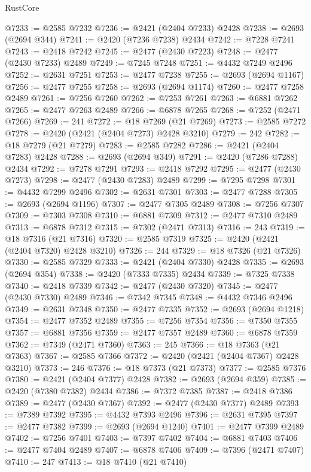 \begin{lexlean}{RustCore}
\begin{coremodule}
@7233 := @2585 @7232
@7236 := @2421 (@2404 @7233) @2428
@7238 := @2693 (@2694 @344)
@7241 := @2420 (@7236 @7238) @2434
@7242 := @7228 @7241
@7243 := @2418 @7242
@7245 := @2477 (@2430 @7223)
@7248 := @2477 (@2430 @7233) @2489
@7249 := @7245 @7248
@7251 := @4432 @7249 @2496
@7252 := @2631 @7251
@7253 := @2477 @7238
@7255 := @2693 (@2694 @1167)
@7256 := @2477 @7255
@7258 := @2693 (@2694 @1174)
@7260 := @2477 @7258 @2489
@7261 := @7256 @7260
@7262 := @7253 @7261
@7263 := @6881 @7262
@7265 := @2477 @7263 @2489
@7266 := @6878 @7265
@7268 := @7252 (@2471 @7266)
@7269 := 241
@7272 := @18 @7269 (@21 @7269)
@7273 := @2585 @7272
@7278 := @2420 (@2421 (@2404 @7273) @2428 @3210)
@7279 := 242
@7282 := @18 @7279 (@21 @7279)
@7283 := @2585 @7282
@7286 := @2421 (@2404 @7283) @2428
@7288 := @2693 (@2694 @349)
@7291 := @2420 (@7286 @7288) @2434
@7292 := @7278 @7291
@7293 := @2418 @7292
@7295 := @2477 (@2430 @7273)
@7298 := @2477 (@2430 @7283) @2489
@7299 := @7295 @7298
@7301 := @4432 @7299 @2496
@7302 := @2631 @7301
@7303 := @2477 @7288
@7305 := @2693 (@2694 @1196)
@7307 := @2477 @7305 @2489
@7308 := @7256 @7307
@7309 := @7303 @7308
@7310 := @6881 @7309
@7312 := @2477 @7310 @2489
@7313 := @6878 @7312
@7315 := @7302 (@2471 @7313)
@7316 := 243
@7319 := @18 @7316 (@21 @7316)
@7320 := @2585 @7319
@7325 := @2420 (@2421 (@2404 @7320) @2428 @3210)
@7326 := 244
@7329 := @18 @7326 (@21 @7326)
@7330 := @2585 @7329
@7333 := @2421 (@2404 @7330) @2428
@7335 := @2693 (@2694 @354)
@7338 := @2420 (@7333 @7335) @2434
@7339 := @7325 @7338
@7340 := @2418 @7339
@7342 := @2477 (@2430 @7320)
@7345 := @2477 (@2430 @7330) @2489
@7346 := @7342 @7345
@7348 := @4432 @7346 @2496
@7349 := @2631 @7348
@7350 := @2477 @7335
@7352 := @2693 (@2694 @1218)
@7354 := @2477 @7352 @2489
@7355 := @7256 @7354
@7356 := @7350 @7355
@7357 := @6881 @7356
@7359 := @2477 @7357 @2489
@7360 := @6878 @7359
@7362 := @7349 (@2471 @7360)
@7363 := 245
@7366 := @18 @7363 (@21 @7363)
@7367 := @2585 @7366
@7372 := @2420 (@2421 (@2404 @7367) @2428 @3210)
@7373 := 246
@7376 := @18 @7373 (@21 @7373)
@7377 := @2585 @7376
@7380 := @2421 (@2404 @7377) @2428
@7382 := @2693 (@2694 @359)
@7385 := @2420 (@7380 @7382) @2434
@7386 := @7372 @7385
@7387 := @2418 @7386
@7389 := @2477 (@2430 @7367)
@7392 := @2477 (@2430 @7377) @2489
@7393 := @7389 @7392
@7395 := @4432 @7393 @2496
@7396 := @2631 @7395
@7397 := @2477 @7382
@7399 := @2693 (@2694 @1240)
@7401 := @2477 @7399 @2489
@7402 := @7256 @7401
@7403 := @7397 @7402
@7404 := @6881 @7403
@7406 := @2477 @7404 @2489
@7407 := @6878 @7406
@7409 := @7396 (@2471 @7407)
@7410 := 247
@7413 := @18 @7410 (@21 @7410)

\end{coremodule}
\end{lexlean}
